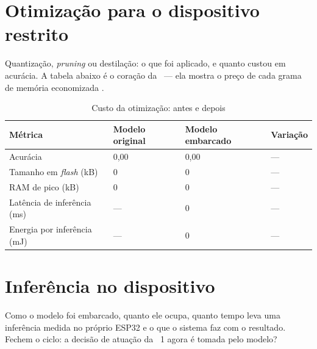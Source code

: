 \section{Otimização para o dispositivo restrito}

\begin{orientacao}
Quantização, \emph{pruning} ou destilação: o que foi aplicado, e quanto
custou em acurácia. A tabela abaixo é o coração da \rotuloAP\ ---
ela mostra o preço de cada grama de memória economizada
\cite{warden2019}.
\end{orientacao}

\begin{table}[H]
\centering
\caption{Custo da otimização: antes e depois}
\label{tab:otimizacao}
\footnotesize
\begin{tabular}{@{}L{4.2cm}R{2.8cm}R{2.8cm}R{3.2cm}@{}}
\toprule
\textbf{Métrica} & \textbf{Modelo original} & \textbf{Modelo embarcado} & \textbf{Variação} \\
\midrule
Acurácia & 0,00 & 0,00 & --- \\
Tamanho em \emph{flash} (kB) & 0 & 0 & --- \\
RAM de pico (kB) & 0 & 0 & --- \\
Latência de inferência (ms) & --- & 0 & --- \\
Energia por inferência (mJ) & --- & 0 & --- \\
\bottomrule
\end{tabular}
\end{table}

\section{Inferência no dispositivo}

\begin{orientacao}
Como o modelo foi embarcado, quanto ele ocupa, quanto tempo leva uma
inferência medida no próprio ESP32 e o que o sistema faz com o
resultado. Fechem o ciclo: a decisão de atuação da \rotuloAP\ 1 agora é
tomada pelo modelo?
\end{orientacao}
